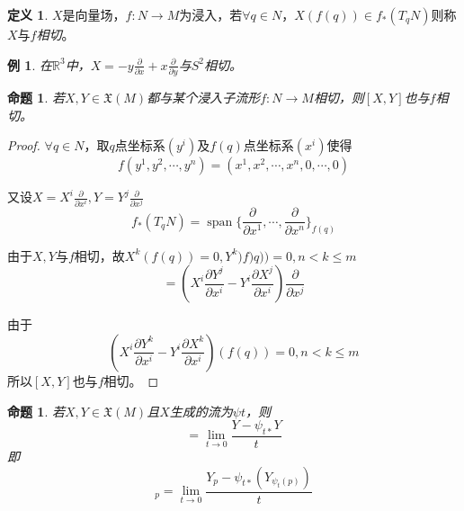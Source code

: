 \documentclass[winfonts,UTF8,c5size,a4paper,fancyhdr,hyperref,titlepage,nocap]{ctexart}
\newtheorem{prop}[thm]{命题}
\newtheorem{exa}[thm]{例}
\theoremstyle{definition}
\newtheorem{defn}[thm]{定义}
\theoremstyle{remark}
\numberwithin{equation}{subsection}
\newcommand{\Real}{\mathbb{R}}
\newcommand{\red}{\color{red}}
\newcommand{\pfrac}[2]{\frac{\partial{#1}}{\partial{#2}}}
\newcommand{\spa}{\operatorname{span}}
\newcommand{\Xf}[1]{\mathfrak{X}(#1)}
\begin{document}
\begin{defn}
  $X$是向量场，$f\colon N\to M$为浸入，若$\forall q\in N$，$X(f(q))\in f_{\ast}(T_qN)$则称$X$与$f$\emph{\red 相切}。
\end{defn}
\begin{exa}
  在$\Real^3$中，$X=-y\pfrac{}{x}+x\pfrac{}{y}$与$S^2$相切。
\end{exa}
\begin{prop}
  若$X,Y\in\Xf{M}$都与某个浸入子流形$f\colon N\to M$相切，则$[X,Y]$也与$f$相切。
\end{prop}
\begin{proof}
  $\forall q\in N$，取$q$点坐标系$(y^i)$及$f(q)$点坐标系$(x^i)$使得
\begin{equation*}
f(y^1,y^2,\cdots,y^n)=(x^1,x^2,\cdots,x^n,0,\cdots,0)
\end{equation*}

又设$X=X^i\pfrac{}{x^i},Y=Y^j\pfrac{}{x^j}$
\begin{equation*}
f_{\ast}(T_qN)=\spa\{\pfrac{}{x^1},\cdots,\pfrac{}{x^n}\}_{f(q)}
\end{equation*}

由于$X,Y$与$f$相切，故$X^k(f(q))=0, Y^k)f)q))=0, n<k\leqslant m$
\begin{equation*}
[X,Y]=(X^i\pfrac{Y^j}{x^i}-Y^i\pfrac{X^j}{x^i})\pfrac{}{x^j}
\end{equation*}

由于
\begin{equation*}
(X^i\pfrac{Y^k}{x^i}-Y^i\pfrac{X^k}{x^i})(f(q))=0, n<k\leqslant m
\end{equation*}
所以$[X,Y]$也与$f$相切。
\end{proof}
\begin{prop}
  若$X,Y\in\Xf{M}$且$X$生成的流为$\psi t$，则
\begin{equation*}
[X,Y]=\lim_{t\to0}\frac{Y-\psi_{t\ast}Y}{t}
\end{equation*}
即
\begin{equation*}
[X,Y]_p=\lim_{t\to0}\frac{Y_p-\psi_{t\ast}(Y_{\psi_t(p)})}{t}
\end{equation*}
\end{prop}
\end{document}
